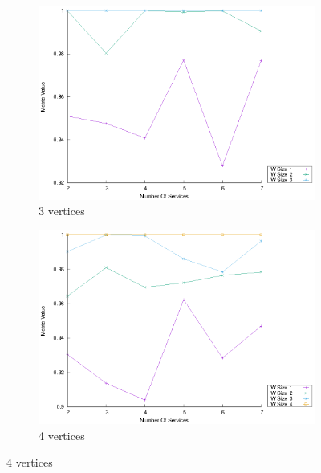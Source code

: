 \begin{figure}[!htb]
  \centering
  \begin{subfigure}{0.33\textwidth}
    \includegraphics[width=\textwidth]{Images/graphs/window_quality_performance_diff_perce_n7_s7_50_89_n3}
    \caption{3 vertices}
    \label{fig:quality_window_average_perce_3n}
  \end{subfigure}
  \hfill
  \begin{subfigure}{0.33\textwidth}
    \includegraphics[width=\textwidth]{Images/graphs/window_quality_performance_diff_perce_n7_s7_50_89_n4}
    \caption{4 vertices}
    \label{fig:quality_window_average_perce_4n}


\end{subfigure}
\end{figure}
